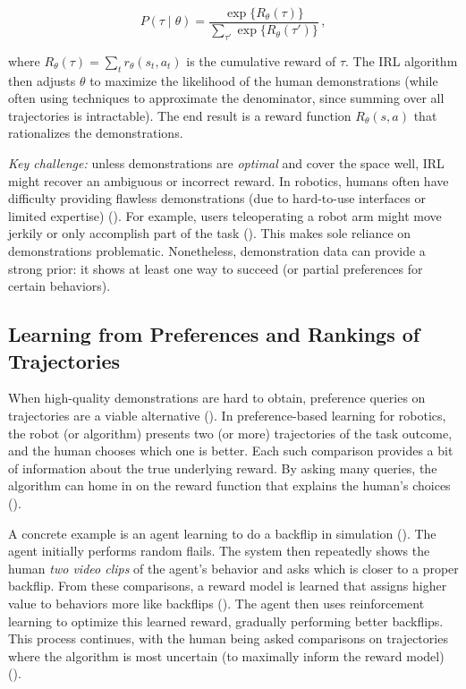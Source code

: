 \documentclass[
  letterpaper,
  numbers=noenddot,
  DIV=11]{scrreprt}
\theoremstyle{plain}
\theoremstyle{definition}
\theoremstyle{remark}
\begin{document}
\[
P(\tau \mid \theta) = \frac{\exp\{R_\theta(\tau)\}}{\displaystyle \sum_{\tau'} \exp\{R_\theta(\tau')\}} \,,
\]

where \(R_\theta(\tau) = \sum_{t} r_\theta(s_t, a_t)\) is the cumulative
reward of \(\tau\). The IRL algorithm then adjusts \(\theta\) to
maximize the likelihood of the human demonstrations (while often using
techniques to approximate the denominator, since summing over all
trajectories is intractable). The end result is a reward function
\(R_\theta(s,a)\) that rationalizes the demonstrations.

\emph{Key challenge:} unless demonstrations are \emph{optimal} and cover
the space well, IRL might recover an ambiguous or incorrect reward. In
robotics, humans often have difficulty providing flawless demonstrations
(due to hard-to-use interfaces or limited expertise)
(). For
example, users teleoperating a robot arm might move jerkily or only
accomplish part of the task
(). This
makes sole reliance on demonstrations problematic. Nonetheless,
demonstration data can provide a strong prior: it shows at least one way
to succeed (or partial preferences for certain behaviors).

\subsection*{Learning from Preferences and Rankings of
Trajectories}\label{learning-from-preferences-and-rankings-of-trajectories}

When high-quality demonstrations are hard to obtain, preference queries
on trajectories are a viable alternative
(). In
preference-based learning for robotics, the robot (or algorithm)
presents two (or more) trajectories of the task outcome, and the human
chooses which one is better. Each such comparison provides a bit of
information about the true underlying reward. By asking many queries,
the algorithm can home in on the reward function that explains the
human's choices
().

A concrete example is an agent learning to do a backflip in simulation
(). The agent
initially performs random flails. The system then repeatedly shows the
human \emph{two video clips} of the agent's behavior and asks which is
closer to a proper backflip. From these comparisons, a reward model is
learned that assigns higher value to behaviors more like backflips
(). The agent
then uses reinforcement learning to optimize this learned reward,
gradually performing better backflips. This process continues, with the
human being asked comparisons on trajectories where the algorithm is
most uncertain (to maximally inform the reward model)
().
\end{document}
